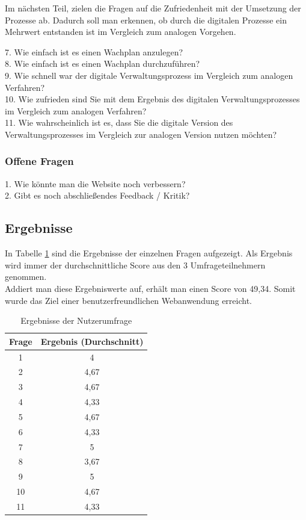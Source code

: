\documentclass[fontsize=12pt,openright,oneside,paper=a4,BCOR=1cm]{scrbook}
\begin{document}
Im nächsten Teil, zielen die Fragen auf die Zufriedenheit mit der Umsetzung der Prozesse ab. Dadurch soll man erkennen, ob durch die digitalen Prozesse ein Mehrwert entstanden ist im Vergleich zum analogen Vorgehen.

7. Wie einfach ist es einen Wachplan anzulegen?\\
8. Wie einfach ist es einen Wachplan durchzuführen? \\
9. Wie schnell war der digitale Verwaltungsprozess im Vergleich zum analogen Verfahren? \\
10. Wie zufrieden sind Sie mit dem Ergebnis des digitalen Verwaltungsprozesses im Vergleich zum analogen Verfahren? \\
11. Wie wahrscheinlich ist es, dass Sie die digitale Version des Verwaltungsprozesses im Vergleich zur analogen Version nutzen möchten?

\subsubsection{Offene Fragen}
1. Wie könnte man die Website noch verbessern? \\
2. Gibt es noch abschließendes Feedback / Kritik?\\

\subsection{Ergebnisse}
In Tabelle \ref{tab:survey} sind die Ergebnisse der einzelnen Fragen aufgezeigt. Als Ergebnis wird immer der durchschnittliche Score aus den 3 Umfrageteilnehmern genommen. \\
Addiert man diese Ergebniswerte auf, erhält man einen Score von 49,34. Somit wurde das Ziel einer benutzerfreundlichen Webanwendung erreicht.

\begin{table}[ht]
\centering
\caption{Ergebnisse der Nutzerumfrage}
\label{tab:survey}
\begin{tabular}{|c|c|}
\hline
Frage & Ergebnis (Durchschnitt) \\
\hline
1 & 4\\
2 & 4,67\\
3 & 4,67\\
4 & 4,33\\
5 & 4,67\\
6 & 4,33\\
7 & 5\\
8 & 3,67\\
9 & 5 \\
10 & 4,67 \\
11 & 4,33 \\
\hline
\end{tabular}
\end{table}
\end{document}
